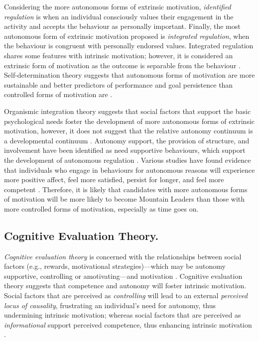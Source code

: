\documentclass[
  12pt,
  a4paper,
]{book}
\begin{document}
Considering the more autonomous forms of extrinsic motivation, \emph{identified regulation} is when an individual consciously values their engagement in the activity and accepts the behaviour as personally important. Finally, the most autonomous form of extrinsic motivation proposed is \emph{integrated regulation}, when the behaviour is congruent with personally endorsed values. Integrated regulation shares some features with intrinsic motivation; however, it is considered an extrinsic form of motivation as the outcome is separable from the behaviour \citep{Ryan2002}. Self-determination theory suggests that autonomous forms of motivation are more sustainable and better predictors of performance and goal persistence than controlled forms of motivation are \citep{Hagger2015, Pelletier2001, Ryan2019}.

Organismic integration theory suggests that social factors that support the basic psychological needs foster the development of more autonomous forms of extrinsic motivation, however, it does not suggest that the relative autonomy continuum is a developmental continuum \citep{Deci1991, Ryan1995, Ryan2002}. Autonomy support, the provision of structure, and involvement have been identified as need supportive behaviours, which support the development of autonomous regulation \citep{Ryan2016, Markland2010}. Various studies have found evidence that individuals who engage in behaviours for autonomous reasons will experience more positive affect, feel more satisfied, persist for longer, and feel more competent \citep[cf.~][]{Frederick-Recascino2002}. Therefore, it is likely that candidates with more autonomous forms of motivation will be more likely to become Mountain Leaders than those with more controlled forms of motivation, especially as time goes on.

\hypertarget{cognitive-evaluation-theory.}{%
\subsection{Cognitive Evaluation Theory.}\label{cognitive-evaluation-theory.}}

\emph{Cognitive evaluation theory} is concerned with the relationships between social factors (e.g., rewards, motivational strategies)---which may be autonomy supportive, controlling or amotivating---and motivation \citep{Deci1975, Deci1980}. Cognitive evaluation theory suggests that competence and autonomy will foster intrinsic motivation. Social factors that are perceived as \emph{controlling} will lead to an external \emph{perceived locus of causality}, frustrating an individual's need for autonomy, thus undermining intrinsic motivation; whereas social factors that are perceived as \emph{informational} support perceived competence, thus enhancing intrinsic motivation \citep{Ryan2019}.
\end{document}
